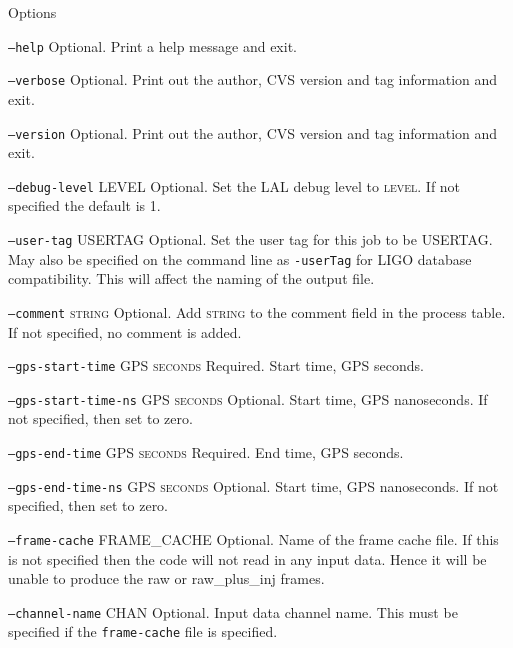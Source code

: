 \begin{entry}
\item[Options]\leavevmode
\begin{entry}

\item[\texttt{--help}]  Optional.  Print a help message and exit.

\item[\texttt{--verbose}] Optional.  Print out the author, CVS version
and tag information and exit.

\item[\texttt{--version}] Optional.  Print out the author, CVS version and
tag information and exit.
  
\item[\texttt{--debug-level} \textsc{LEVEL}] Optional. Set the LAL debug
level to \textsc{level}. If not specified the default is 1.

\item[\texttt{--user-tag} \textsc{USERTAG}] Optional. Set the user tag
for this job to be \textsc{USERTAG}. May also be specified on the command
line as \texttt{-userTag} for LIGO database compatibility.  This will
affect the naming of the output file.

\item[\texttt{--comment} \textsc{string}] Optional. Add \textsc{string}
to the comment field in the process table. If not specified, no comment
is added. 

\item[\texttt{--gps-start-time} \textsc{GPS seconds}] Required.  Start
time, GPS seconds.

\item[\texttt{--gps-start-time-ns} \textsc{GPS seconds}] Optional.
Start time, GPS nanoseconds.  If not specified, then set to zero.

\item[\texttt{--gps-end-time} \textsc{GPS seconds}] Required.  End
time, GPS seconds.

\item[\texttt{--gps-end-time-ns} \textsc{GPS seconds}] Optional.
Start time, GPS nanoseconds.  If not specified, then set to zero.

\item[\texttt{--frame-cache} \textsc{FRAME\_CACHE}] Optional.  Name of
the frame cache file.  If this is not specified then the code will not
read in any input data.  Hence it will be unable to produce the raw or
raw\_plus\_inj frames.

\item[\texttt{--channel-name} \textsc{CHAN}] Optional.  Input data
channel name.  This must be specified if the \texttt{frame-cache} file
is specified. 
 

\end{entry}
\end{entry}
